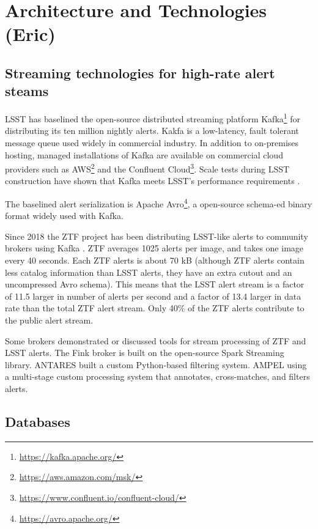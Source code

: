 \section{Architecture and Technologies (Eric) } \label{sec:archandtech}

\subsection{Streaming technologies for high-rate alert steams}

LSST has baselined the open-source distributed streaming platform Kafka\footnote{\url{https://kafka.apache.org/}} for distributing its ten million nightly alerts.
Kakfa is a low-latency, fault tolerant message queue used widely in commercial industry.
In addition to on-premises hosting, managed installations of Kafka are available on commercial cloud providers such as  {AWS}\footnote{\url{https://aws.amazon.com/msk/}} and the Confluent Cloud\footnote{\url{https://www.confluent.io/confluent-cloud/}}.
Scale tests during   LSST construction have shown that Kafka meets   LSST's performance requirements \citep{DMTN-028}. 

The baselined alert serialization is Apache Avro\footnote{\url{https://avro.apache.org/}}, a open-source schema-ed binary format widely used with Kafka.

Since 2018 the  {ZTF} project has been distributing   LSST-like alerts to community brokers using Kafka \citep{Patterson:19:ZTFAlerts}.
ZTF averages 1025 alerts per image, and takes one image every 40 seconds.
Each  {ZTF} alerts is about 70 kB (although  {ZTF} alerts contain less catalog information than   LSST alerts, they have an extra cutout and an uncompressed Avro schema). 
This means that the   LSST alert stream is a factor of 11.5 larger in number of alerts per second and a factor of 13.4 larger in data rate than the total  {ZTF} alert stream.
Only 40\% of the  {ZTF} alerts contribute to the public alert stream.

Some brokers demonstrated or discussed tools for stream processing of  {ZTF} and   LSST alerts.
The Fink broker is built on the open-source Spark Streaming library.
ANTARES built a custom Python-based filtering system.
AMPEL using a multi-stage custom processing system that annotates, cross-matches, and filters alerts.

\subsection{Databases}

